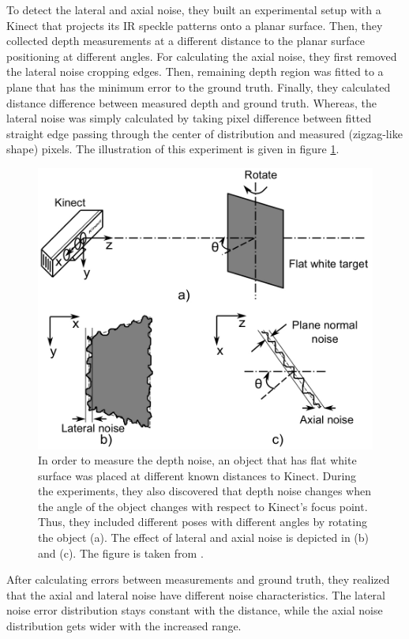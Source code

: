 \documentclass[a4paper]{report}
\numberwithin{figure}{section}
\begin{document}
To detect the lateral and axial noise, they built an experimental setup with a
Kinect that projects its IR speckle patterns onto a planar surface.  Then, they
collected depth measurements at a different distance to the planar surface
positioning at different angles.  For calculating the axial noise, they first
removed the lateral noise cropping edges. Then, remaining depth region was
fitted to a plane that has the minimum error to the ground truth. Finally, they
calculated distance difference between measured depth and ground truth.
Whereas, the lateral noise was simply calculated by taking pixel difference
between fitted straight edge passing through the center of distribution and
measured (zigzag-like shape) pixels. The illustration of this experiment is
given in figure \ref{fig:kinect_noise_experiment}.

\begin{figure}[H] \centering
\includegraphics[width=0.7\linewidth,natwidth=640,natheight=640]
{fig/ref_imgs/kinect_noise_experiment.png} \caption[Kinect's Depth Noise
Experiment]{In order to measure the depth noise, an object that has flat white
surface was placed at different known distances to Kinect. During the
experiments, they also discovered that depth noise changes when the angle of
the object changes with respect to Kinect's focus point. Thus, they included
different poses with different angles by rotating the object (a).  The effect
of lateral and axial noise is depicted in (b) and (c).  The figure is taken
from \parencite{Nguyen2012a}.} \label{fig:kinect_noise_experiment} \end{figure}

After calculating errors between measurements and ground truth, they realized
that the axial and lateral noise have different noise characteristics. The
lateral noise error distribution stays constant with the distance, while the
axial noise distribution gets wider with the increased range.
\end{document}
